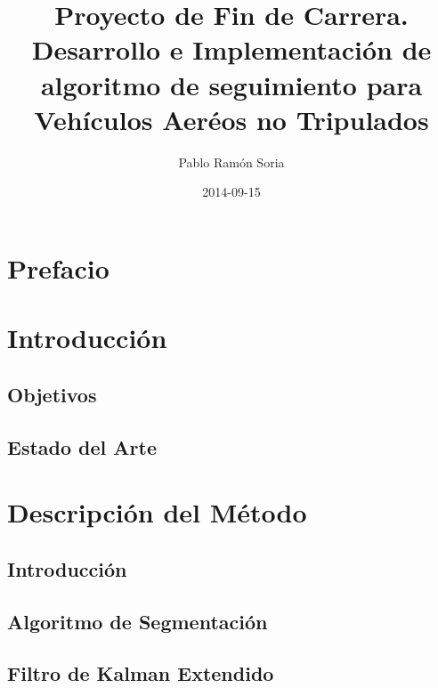 \documentclass[11pt, oneside]{book} %
\begin{document}
\frontmatter
\title{Proyecto de Fin de Carrera. \\ Desarrollo e Implementación de algoritmo de seguimiento para Vehículos Aeréos no Tripulados}
\author{Pablo Ram\'on Soria}
\date{2014-09-15}
\maketitle

\tableofcontents

\chapter{Prefacio}


\chapter{Introducci\'on}
\section{Objetivos}


\section{Estado del Arte}

\mainmatter

\chapter{Descripci\'on del M\'etodo}
\section{Introducci\'on}


\section{Algoritmo de Segmentaci\'on}


\newpage
\section{Filtro de Kalman Extendido}

\end{document}
